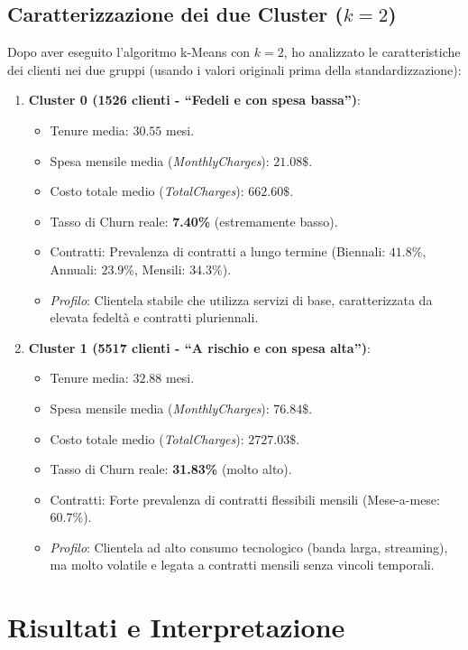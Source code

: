 \documentclass[a4paper,11pt]{article}
\begin{document}
\subsection{Caratterizzazione dei due Cluster ($k=2$)}
Dopo aver eseguito l'algoritmo k-Means con $k=2$, ho analizzato le caratteristiche dei clienti nei due gruppi (usando i valori originali prima della standardizzazione):
\begin{enumerate}
    \item \textbf{Cluster 0 (1526 clienti - ``Fedeli e con spesa bassa'')}:
    \begin{itemize}
        \item Tenure media: $30.55$ mesi.
        \item Spesa mensile media (\textit{MonthlyCharges}): $21.08\$$.
        \item Costo totale medio (\textit{TotalCharges}): $662.60\$$.
        \item Tasso di Churn reale: \textbf{7.40\%} (estremamente basso).
        \item Contratti: Prevalenza di contratti a lungo termine (Biennali: $41.8\%$, Annuali: $23.9\%$, Mensili: $34.3\%$).
        \item \textit{Profilo}: Clientela stabile che utilizza servizi di base, caratterizzata da elevata fedeltà e contratti pluriennali.
    \end{itemize}
    \item \textbf{Cluster 1 (5517 clienti - ``A rischio e con spesa alta'')}:
    \begin{itemize}
        \item Tenure media: $32.88$ mesi.
        \item Spesa mensile media (\textit{MonthlyCharges}): $76.84\$$.
        \item Costo totale medio (\textit{TotalCharges}): $2727.03\$$.
        \item Tasso di Churn reale: \textbf{31.83\%} (molto alto).
        \item Contratti: Forte prevalenza di contratti flessibili mensili (Mese-a-mese: $60.7\%$).
        \item \textit{Profilo}: Clientela ad alto consumo tecnologico (banda larga, streaming), ma molto volatile e legata a contratti mensili senza vincoli temporali.
    \end{itemize}
\end{enumerate}

\section{Risultati e Interpretazione}
\label{sec:risultati}
\end{document}
